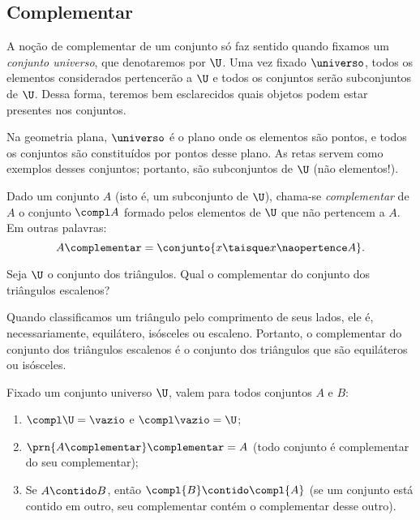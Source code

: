 \subsection{Complementar}
A noção de complementar de um conjunto só faz sentido quando fixamos um \emph{conjunto universo}, que denotaremos por $\U$. Uma vez fixado $\universo$, todos os elementos considerados pertencerão a $\U$ e todos os conjuntos serão subconjuntos de $\U$. Dessa forma, teremos bem esclarecidos quais objetos podem estar presentes nos conjuntos.

\begin{example}
	Na geometria plana, $\universo$ é o plano onde os elementos são pontos, e todos os conjuntos são constituídos por pontos desse plano. As retas servem como exemplos desses conjuntos; portanto, são subconjuntos de $\U$ (não elementos!).
\end{example}

\begin{definition}[Complementar]
	\label{def:complementar}
	Dado um conjunto $A$ (isto é, um subconjunto de $\U$), chama-se \emph{complementar} de $A$ o conjunto $\compl A$ formado pelos elementos de $\U$ que não pertencem a $A$.
	Em outras palavras:
	\[
		A\complementar = \conjunto{ x \taisque x \naopertence A}.
	\]
\end{definition}

\begin{example}
	Seja $\U$ o conjunto dos triângulos. Qual o complementar do conjunto dos triângulos escalenos?
\end{example}

\begin{solution}
	Quando classificamos um triângulo pelo comprimento de seus lados, ele é, necessariamente, equilátero, isósceles ou escaleno. Portanto, o complementar do conjunto dos triângulos escalenos é o conjunto dos triângulos que são equiláteros ou isósceles.
\end{solution}

\begin{proposition}
	\label{prop:complementar}
	Fixado um conjunto universo $\U$, valem para todos conjuntos $A$ e $B$:
	\begin{enumerate}
		\item
			\label{prop:complementar:universo}
			$\compl\U = \vazio$ e $\compl\vazio = \U$;
		\item
			\label{prop:complementar:complementar-do-complementar}
			$\prn{A\complementar}\complementar = A$ (todo conjunto é complementar do seu complementar);
		\item
			\label{prop:complementar:contrapositiva}
			Se $A \contido B$, então $\compl{B} \contido \compl{A}$ (se um conjunto está contido em outro, seu complementar contém o complementar desse outro). 
	\end{enumerate}
\end{proposition}

